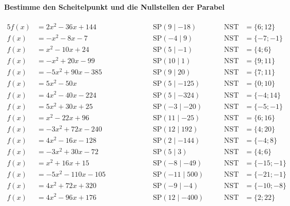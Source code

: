 \documentclass
[
  draft    = true,
  fontsize = 11pt,
  parskip  = half-,
  BCOR     = 0pt,
  DIV      = 11
]
{scrartcl}
\begin{document}
\paragraph{Bestimme den Scheitelpunkt und die Nullstellen der Parabel}
\begin{alignat*}{5}
  f(x)&=2x^{2}-36x+144 \qquad&\qquad \quad&\text{SP}(9\mid-18) \quad&\quad \text{NST}&=\{6;12\} \\[0.5ex]
  f(x)&=-x^{2}-8x-7 \qquad&\qquad \quad&\text{SP}(-4\mid9) \quad&\quad \text{NST}&=\{-7;-1\} \\[0.5ex]
  f(x)&=x^{2}-10x+24 \qquad&\qquad \quad&\text{SP}(5\mid-1) \quad&\quad \text{NST}&=\{4;6\} \\[0.5ex]
  f(x)&=-x^{2}+20x-99 \qquad&\qquad \quad&\text{SP}(10\mid1) \quad&\quad \text{NST}&=\{9;11\} \\[0.5ex]
  f(x)&=-5x^{2}+90x-385 \qquad&\qquad \quad&\text{SP}(9\mid20) \quad&\quad \text{NST}&=\{7;11\} \\[0.5ex]
  f(x)&=5x^{2}-50x \qquad&\qquad \quad&\text{SP}(5\mid-125) \quad&\quad \text{NST}&=\{0;10\} \\[0.5ex]
  f(x)&=4x^{2}-40x-224 \qquad&\qquad \quad&\text{SP}(5\mid-324) \quad&\quad \text{NST}&=\{-4;14\} \\[0.5ex]
  f(x)&=5x^{2}+30x+25 \qquad&\qquad \quad&\text{SP}(-3\mid-20) \quad&\quad \text{NST}&=\{-5;-1\} \\[0.5ex]
  f(x)&=x^{2}-22x+96 \qquad&\qquad \quad&\text{SP}(11\mid-25) \quad&\quad \text{NST}&=\{6;16\} \\[0.5ex]
  f(x)&=-3x^{2}+72x-240 \qquad&\qquad \quad&\text{SP}(12\mid192) \quad&\quad \text{NST}&=\{4;20\} \\[0.5ex]
  f(x)&=4x^{2}-16x-128 \qquad&\qquad \quad&\text{SP}(2\mid-144) \quad&\quad \text{NST}&=\{-4;8\} \\[0.5ex]
  f(x)&=-3x^{2}+30x-72 \qquad&\qquad \quad&\text{SP}(5\mid3) \quad&\quad \text{NST}&=\{4;6\} \\[0.5ex]
  f(x)&=x^{2}+16x+15 \qquad&\qquad \quad&\text{SP}(-8\mid-49) \quad&\quad \text{NST}&=\{-15;-1\} \\[0.5ex]
  f(x)&=-5x^{2}-110x-105 \qquad&\qquad \quad&\text{SP}(-11\mid500) \quad&\quad \text{NST}&=\{-21;-1\} \\[0.5ex]
  f(x)&=4x^{2}+72x+320 \qquad&\qquad \quad&\text{SP}(-9\mid-4) \quad&\quad \text{NST}&=\{-10;-8\} \\[0.5ex]
  f(x)&=4x^{2}-96x+176 \qquad&\qquad \quad&\text{SP}(12\mid-400) \quad&\quad \text{NST}&=\{2;22\} \\[0.5ex]

\end{alignat*}
\end{document}
